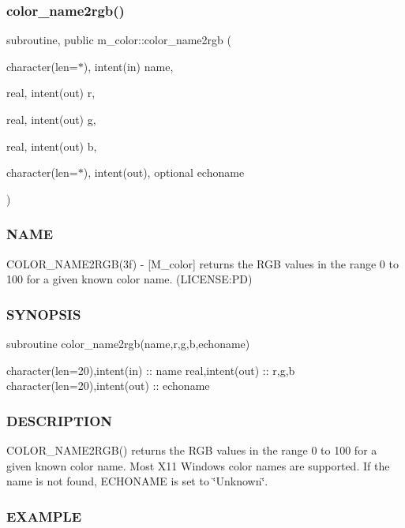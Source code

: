 \subsubsection{\texorpdfstring{color\+\_\+name2rgb()}{color\_name2rgb()}}
{\footnotesize\ttfamily subroutine, public m\+\_\+color\+::color\+\_\+name2rgb (\begin{DoxyParamCaption}\item[{character(len=$\ast$), intent(in)}]{name,  }\item[{real, intent(out)}]{r,  }\item[{real, intent(out)}]{g,  }\item[{real, intent(out)}]{b,  }\item[{character(len=$\ast$), intent(out), optional}]{echoname }\end{DoxyParamCaption})}



\subsubsection*{N\+A\+ME}

C\+O\+L\+O\+R\+\_\+\+N\+A\+M\+E2\+R\+G\+B(3f) -\/ \mbox{[}M\+\_\+color\mbox{]} returns the R\+GB values in the range 0 to 100 for a given known color name. (L\+I\+C\+E\+N\+SE\+:PD) 

\subsubsection*{S\+Y\+N\+O\+P\+S\+IS}

\begin{DoxyVerb}subroutine color_name2rgb(name,r,g,b,echoname)

 character(len=20),intent(in)   :: name
 real,intent(out)               :: r,g,b
 character(len=20),intent(out)  :: echoname
\end{DoxyVerb}


\subsubsection*{D\+E\+S\+C\+R\+I\+P\+T\+I\+ON}

C\+O\+L\+O\+R\+\_\+\+N\+A\+M\+E2\+R\+G\+B() returns the R\+GB values in the range 0 to 100 for a given known color name. Most X11 Windows color names are supported. If the name is not found, E\+C\+H\+O\+N\+A\+ME is set to \char`\"{}\+Unknown\char`\"{}.

\subsubsection*{E\+X\+A\+M\+P\+LE}

